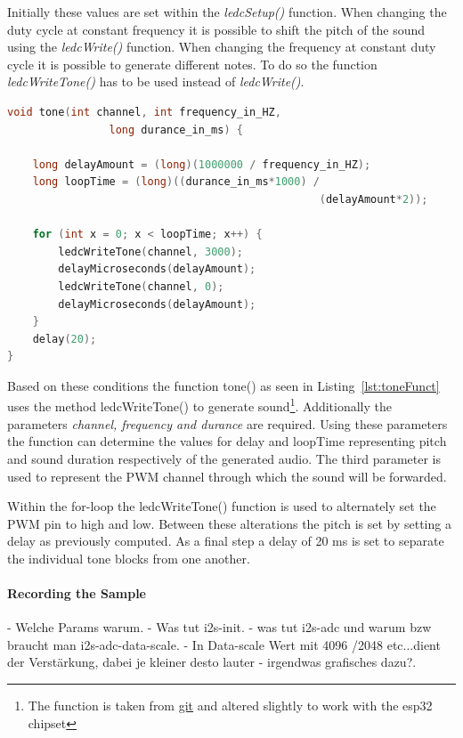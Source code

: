 Initially these values are set within the \textit{ledcSetup()} function.
When changing the duty cycle at constant frequency it is possible to shift the pitch of the sound using the \textit{ledcWrite()} function.
When changing the frequency at constant duty cycle it is possible to generate different notes.
To do so the function \textit{ledcWriteTone()} has to be used instead of \textit{ledcWrite()}.
\begin{lstlisting}[frame=single, language={c++}, style=style,
				   caption={Function used to generate a single note using frequency and sound duration.}, label={lst:toneFunct},float=!htb]
void tone(int channel, int frequency_in_HZ,
		  		long durance_in_ms) {

	long delayAmount = (long)(1000000 / frequency_in_HZ);
	long loopTime = (long)((durance_in_ms*1000) / 
												 (delayAmount*2));

	for (int x = 0; x < loopTime; x++) {
		ledcWriteTone(channel, 3000);
		delayMicroseconds(delayAmount);
		ledcWriteTone(channel, 0);
		delayMicroseconds(delayAmount);
	}
	delay(20);
}
\end{lstlisting}

Based on these conditions the function tone() as seen in Listing~\ref{lst:toneFunct} uses the method ledcWriteTone() to generate sound\footnote{The function is taken from \href{https://gist.github.com/tagliati/1804108}{git} and altered slightly to work with the esp32 chipset}.
Additionally the parameters \textit{channel, frequency and durance} are required.
Using these parameters the function can determine the values for delay and loopTime representing pitch and sound duration respectively of the generated audio.
The third parameter is used to represent the PWM channel through which the sound will be forwarded.

Within the for-loop the ledcWriteTone() function is used to alternately set the PWM pin to high and low.
Between these alterations the pitch is set by setting a delay as previously computed.
As a final step a delay of 20 ms is set to separate the individual tone blocks from one another.

\paragraph{Recording the Sample}

- Welche Params warum.
- Was tut i2s-init.
- was tut i2s-adc und warum bzw braucht man i2s-adc-data-scale.
- In Data-scale Wert mit 4096 /2048 etc...dient der Verstärkung, dabei je kleiner desto lauter
- irgendwas grafisches dazu?.

